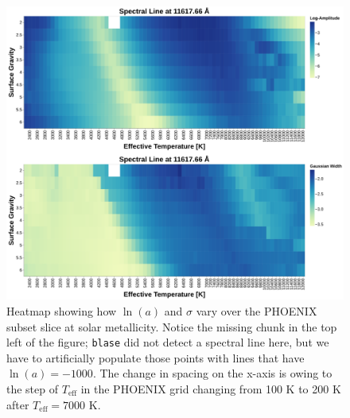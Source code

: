 \documentclass[twocolumn]{aastex631}
\begin{document}
\begin{figure}
    \centering
    \includegraphics[width=\textwidth]{figure2}
    \caption{Heatmap showing how $\ln(a)$ and $\sigma$ vary over the PHOENIX subset
    slice at solar metallicity. Notice the missing chunk in the top left
    of the figure; \texttt{blase} did not detect a spectral line here,
    but we have to artificially populate those points with lines that 
    have $\ln(a) = -1000$. The change in spacing on the x-axis is owing to
    the step of $T_\mathrm{eff}$ in the PHOENIX grid changing from 100 K to 
    200 K after $T_\mathrm{eff} = 7000$ K.}
\end{figure}
\end{document}
